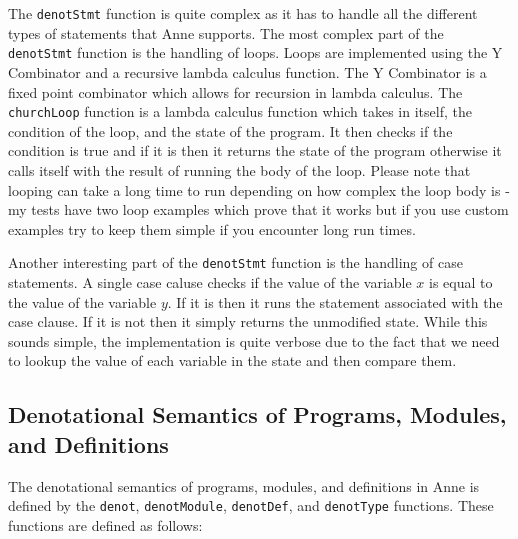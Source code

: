 The \texttt{denotStmt} function is quite complex as it has to handle all the different types of statements that Anne supports. The most complex
part of the \texttt{denotStmt} function is the handling of loops. Loops are implemented using the Y Combinator and a recursive lambda calculus
function. The Y Combinator is a fixed point combinator which allows for recursion in lambda calculus. The \texttt{churchLoop} function is a lambda
calculus function which takes in itself, the condition of the loop, and the state of the program. It then checks if the condition is true and if it
is then it returns the state of the program otherwise it calls itself with the result of running the body of the loop. Please note that looping can take
a long time to run depending on how complex the loop body is - my tests have two loop examples which prove that it works but if you use custom examples try
to keep them simple if you encounter long run times.

Another interesting part of the \texttt{denotStmt} function is the handling of case statements. A single case caluse checks if the value of the
variable $x$ is equal to the value of the variable $y$. If it is then it runs the statement associated with the case clause. If it is not then it simply returns
the unmodified state. While this sounds simple, the implementation is quite verbose due to the fact that we need to lookup the value of each variable in the state
and then compare them.

\subsection{Denotational Semantics of Programs, Modules, and Definitions}

The denotational semantics of programs, modules, and definitions in Anne is defined by the \texttt{denot}, \texttt{denotModule}, \texttt{denotDef}, and \texttt{denotType} functions.
These functions are defined as follows:

